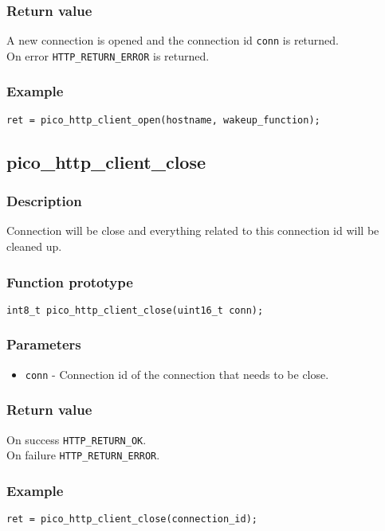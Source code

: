 \subsubsection*{Return value}
A new connection is opened and the connection id \texttt{conn} is returned. 
\\On error \texttt{HTTP\_RETURN\_ERROR} is returned.

\subsubsection*{Example}
\begin{verbatim}
ret = pico_http_client_open(hostname, wakeup_function);
\end{verbatim}


\subsection{pico\_http\_client\_close}

\subsubsection*{Description}
Connection will be close and everything related to this connection id will be cleaned up.

\subsubsection*{Function prototype}
\texttt{int8\_t pico\_http\_client\_close(uint16\_t conn);}

\subsubsection*{Parameters}
\begin{itemize}[noitemsep]
\item \texttt{conn} - Connection id of the connection that needs to be close.
\end{itemize}
\subsubsection*{Return value}
On success \texttt{HTTP\_RETURN\_OK}.
\\On failure \texttt{HTTP\_RETURN\_ERROR}.
\subsubsection*{Example}
\begin{verbatim}
ret = pico_http_client_close(connection_id);
\end{verbatim}

